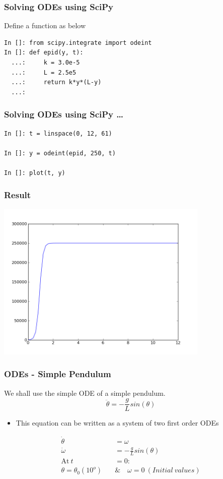 \documentclass[14pt,compress]{beamer}
\newcounter{time}
\newcommand{\inctime}[1]{\addtocounter{time}{#1}{\tiny \thetime\ m}}
\begin{document}
\begin{frame}[fragile]
\frametitle{Solving ODEs using SciPy}
Define a function as below
\small
\begin{lstlisting}
In []: from scipy.integrate import odeint
In []: def epid(y, t):
  ...:     k = 3.0e-5
  ...:     L = 2.5e5
  ...:     return k*y*(L-y)
  ...:
\end{lstlisting}
\end{frame}

\begin{frame}[fragile]
\frametitle{Solving ODEs using SciPy \ldots}
\begin{lstlisting}
In []: t = linspace(0, 12, 61)

In []: y = odeint(epid, 250, t)

In []: plot(t, y)
\end{lstlisting}
\end{frame}

\begin{frame}[fragile]
\frametitle{Result}
\begin{center}
\includegraphics[height=3in, interpolate=true]{data/image}
\end{center}
\vspace*{-0.5in}
\inctime{5}
\end{frame}


\begin{frame}[fragile]
\frametitle{ODEs - Simple Pendulum}
We shall use the simple ODE of a simple pendulum.
\begin{equation*}
\ddot{\theta} = -\frac{g}{L}sin(\theta)
\end{equation*}
\begin{itemize}
\item This equation can be written as a system of two first order ODEs
\end{itemize}
\begin{align}
\dot{\theta} &= \omega \\
\dot{\omega} &= -\frac{g}{L}sin(\theta) \\
 \text{At}\ t &= 0 : \nonumber \\
 \theta = \theta_0(10^o)\quad & \&\quad  \omega = 0\ (Initial\ values)\nonumber
\end{align}
\end{frame}
\end{document}
